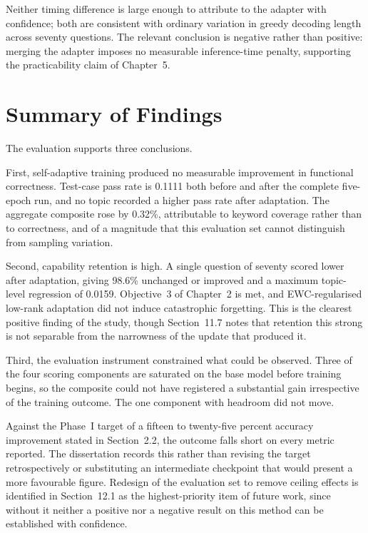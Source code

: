 \documentclass[12pt,a4paper]{report}
\begin{document}
Neither timing difference is large enough to attribute to the adapter with confidence; both are consistent with ordinary variation in greedy decoding length across seventy questions. The relevant conclusion is negative rather than positive: merging the adapter imposes no measurable inference-time penalty, supporting the practicability claim of Chapter~5.

\section{Summary of Findings}

The evaluation supports three conclusions.

First, self-adaptive training produced no measurable improvement in functional correctness. Test-case pass rate is 0.1111 both before and after the complete five-epoch run, and no topic recorded a higher pass rate after adaptation. The aggregate composite rose by 0.32\%, attributable to keyword coverage rather than to correctness, and of a magnitude that this evaluation set cannot distinguish from sampling variation.

Second, capability retention is high. A single question of seventy scored lower after adaptation, giving 98.6\% unchanged or improved and a maximum topic-level regression of 0.0159. Objective~3 of Chapter~2 is met, and EWC-regularised low-rank adaptation did not induce catastrophic forgetting. This is the clearest positive finding of the study, though Section~11.7 notes that retention this strong is not separable from the narrowness of the update that produced it.

Third, the evaluation instrument constrained what could be observed. Three of the four scoring components are saturated on the base model before training begins, so the composite could not have registered a substantial gain irrespective of the training outcome. The one component with headroom did not move.

Against the Phase~I target of a fifteen to twenty-five percent accuracy improvement stated in Section~2.2, the outcome falls short on every metric reported. The dissertation records this rather than revising the target retrospectively or substituting an intermediate checkpoint that would present a more favourable figure. Redesign of the evaluation set to remove ceiling effects is identified in Section~12.1 as the highest-priority item of future work, since without it neither a positive nor a negative result on this method can be established with confidence.
\end{document}
